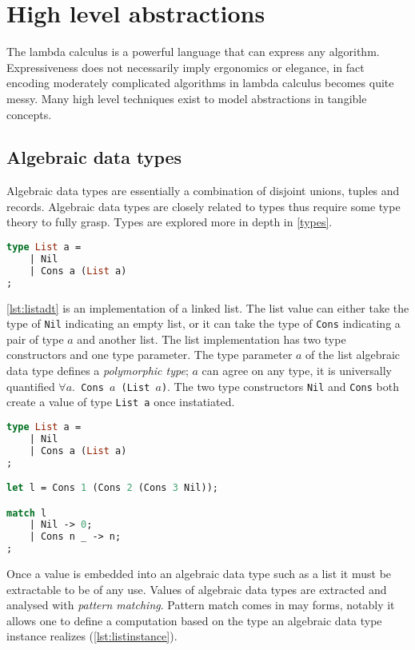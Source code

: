 \documentclass[11pt,oneside,a4paper]{report}
\begin{document}
\section{High level abstractions}\label{sec:highlevel}
The lambda calculus is a powerful language that can express any algorithm.
Expressiveness does not necessarily imply ergonomics or elegance, in fact encoding moderately complicated algorithms in lambda calculus becomes quite messy.
Many high level techniques exist to model abstractions in tangible concepts.

\subsection{Algebraic data types}
Algebraic data types are essentially a combination of disjoint unions, tuples and records.
Algebraic data types are closely related to types thus require some type theory to fully grasp.
Types are explored more in depth in \autoref{types}.
\begin{lstlisting}[language=ML,caption={List algebraic data type},label={lst:listadt}]
type List a = 
    | Nil
    | Cons a (List a)
;
\end{lstlisting}
\autoref{lst:listadt} is an implementation of a linked list. 
The list value can either take the type of \texttt{Nil} indicating an empty list, or it can take the type of \texttt{Cons} indicating a pair of type $a$ and another list.
The list implementation has two type constructors and one type parameter.
The type parameter $a$ of the list algebraic data type defines a \textit{polymorphic type}; $a$ can agree on any type, it is universally quantified \texttt{$\forall a. $ Cons $a$ (List $a$)}.
The two type constructors \texttt{Nil} and \texttt{Cons} both create a value of type \texttt{List a} once instatiated.
\begin{lstlisting}[language=ML,caption={List instance and match},label={lst:listinstance}]
type List a = 
    | Nil
    | Cons a (List a)
;

let l = Cons 1 (Cons 2 (Cons 3 Nil));

match l 
    | Nil -> 0;
    | Cons n _ -> n;
;
\end{lstlisting}
Once a value is embedded into an algebraic data type such as a list it must be extractable to be of any use.
Values of algebraic data types are extracted and analysed with \textit{pattern matching}.
Pattern match comes in may forms, notably it allows one to define a computation based on the type an algebraic data type instance realizes (\autoref{lst:listinstance}).
\end{document}
